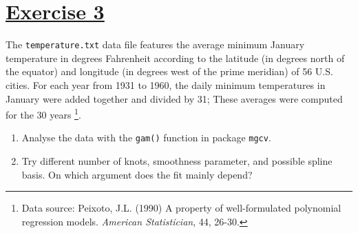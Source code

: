\documentclass[a4paper,12pt]{article}\usepackage[]{graphicx}\usepackage[]{color}
\begin{document}
\section{\underline{Exercise 3}}

The \verb"temperature.txt" data file features the average minimum January temperature in degrees Fahrenheit according to the latitude (in degrees north of the equator) and longitude (in degrees west of the prime meridian) of 56 U.S. cities. For each year from 1931 to 1960, the daily minimum temperatures in January were added together and divided by 31; These averages were computed for the 30 years \footnote{Data source: Peixoto, J.L. (1990) A property of well-formulated polynomial
regression models. \textit{American Statistician}, 44, 26-30.}.

\begin{enumerate}[label=\textbf{\alph*})]
\item{Analyse the data with the \verb"gam()" function in package \verb"mgcv".}
\item{Try different number of knots, smoothness parameter, and possible spline basis. On which argument does the fit mainly depend?}
\end{enumerate}
\end{document}
